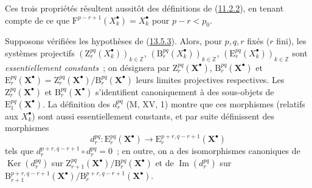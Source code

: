Ces trois propriétés résultent aussitôt des définitions de
(\hyperref[0.11.2.2-fr]{11.2.2}), en tenant compte de ce que
$\mathrm F^{p-r+1}(X_k^\bullet)=X_k^\bullet$ pour $p-r<p_0$.

\begin{env}[13.5.4]
\label{0.13.5.4-fr}
Supposons vérifiées les hypothèses de
(\hyperref[0.13.5.3-fr]{13.5.3}). Alors, pour $p,q,r$ fixés ($r$ fini), les
systèmes projectifs
$(\mathrm Z_r^{pq}(X_k^\bullet))_{k\in\mathbb Z}$,
$(\mathrm B_r^{pq}(X_k^\bullet))_{k\in\mathbb Z}$,
$(\mathrm E_r^{pq}(X_k^\bullet))_{k\in\mathbb Z}$
sont \emph{essentiellement constants}~; on désignera par
$\mathrm Z_r^{pq}(\mathbf X^\bullet)$,
$\mathrm B_r^{pq}(\mathbf X^\bullet)$ et
$\mathrm E_r^{pq}(\mathbf X^\bullet)=
\mathrm Z_r^{pq}(\mathbf X^\bullet)/
\mathrm B_r^{pq}(\mathbf X^\bullet)$ leurs limites projectives
respectives. Les $\mathrm Z_r^{pq}(\mathbf X^\bullet)$ et
$\mathrm B_r^{pq}(\mathbf X^\bullet)$ s'identifient canoniquement à des
sous-objets de $\mathrm E_1^{pq}(\mathbf X^\bullet)$. La définition des
$d_r^{pq}$ (M, XV, 1) montre que ces morphismes (relatifs aux
$X_k^\bullet$) sont aussi essentiellement constants, et par suite
définissent des morphismes
\begin{equation}
\label{0.13.5.4.1-fr}
\tag{13.5.4.1}
d_r^{pq}:\mathrm E_r^{pq}(\mathbf X^\bullet)
\longrightarrow\mathrm E_r^{p+r,q-r+1}(\mathbf X^\bullet)
\end{equation}
tels que $d_r^{p+r,q-r+1}\circ d_r^{pq}=0$~; en outre, on a des
isomorphismes canoniques de $\operatorname{Ker}(d_r^{pq})$ sur
$\mathrm Z_{r+1}^{pq}(\mathbf X^\bullet)/
\mathrm B_r^{pq}(\mathbf X^\bullet)$ et de
$\operatorname{Im}(d_r^{pq})$ sur
$\mathrm B_{r+1}^{p+r,q-r+1}(\mathbf X^\bullet)/
\mathrm B_r^{p+r,q-r+1}(\mathbf X^\bullet)$.
\end{env}

